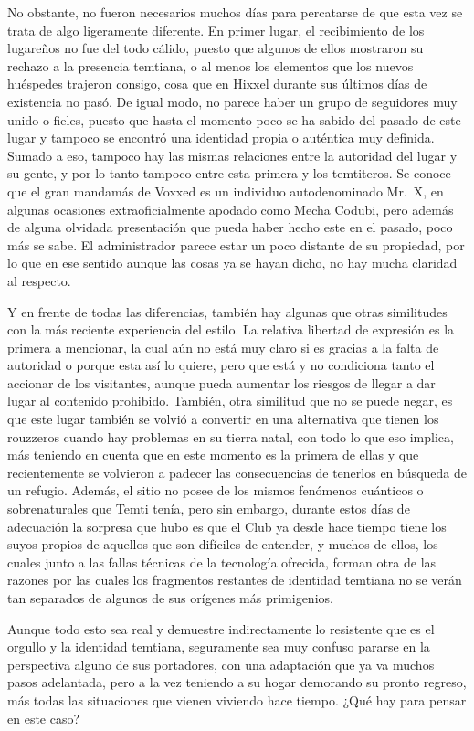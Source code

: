 \documentclass[
  spanish,
]{book}
\begin{document}
No obstante, no fueron necesarios muchos días para percatarse de que esta vez se trata de algo ligeramente diferente. En primer lugar, el recibimiento de los lugareños no fue del todo cálido, puesto que algunos de ellos mostraron su rechazo a la presencia temtiana, o al menos los elementos que los nuevos huéspedes trajeron consigo, cosa que en Hixxel durante sus últimos días de existencia no pasó. De igual modo, no parece haber un grupo de seguidores muy unido o fieles, puesto que hasta el momento poco se ha sabido del pasado de este lugar y tampoco se encontró una identidad propia o auténtica muy definida. Sumado a eso, tampoco hay las mismas relaciones entre la autoridad del lugar y su gente, y por lo tanto tampoco entre esta primera y los temtiteros. Se conoce que el gran mandamás de Voxxed es un individuo autodenominado Mr.~X, en algunas ocasiones extraoficialmente apodado como Mecha Codubi, pero además de alguna olvidada presentación que pueda haber hecho este en el pasado, poco más se sabe. El administrador parece estar un poco distante de su propiedad, por lo que en ese sentido aunque las cosas ya se hayan dicho, no hay mucha claridad al respecto.

Y en frente de todas las diferencias, también hay algunas que otras similitudes con la más reciente experiencia del estilo. La relativa libertad de expresión es la primera a mencionar, la cual aún no está muy claro si es gracias a la falta de autoridad o porque esta así lo quiere, pero que está y no condiciona tanto el accionar de los visitantes, aunque pueda aumentar los riesgos de llegar a dar lugar al contenido prohibido. También, otra similitud que no se puede negar, es que este lugar también se volvió a convertir en una alternativa que tienen los rouzzeros cuando hay problemas en su tierra natal, con todo lo que eso implica, más teniendo en cuenta que en este momento es la primera de ellas y que recientemente se volvieron a padecer las consecuencias de tenerlos en búsqueda de un refugio. Además, el sitio no posee de los mismos fenómenos cuánticos o sobrenaturales que Temti tenía, pero sin embargo, durante estos días de adecuación la sorpresa que hubo es que el Club ya desde hace tiempo tiene los suyos propios de aquellos que son difíciles de entender, y muchos de ellos, los cuales junto a las fallas técnicas de la tecnología ofrecida, forman otra de las razones por las cuales los fragmentos restantes de identidad temtiana no se verán tan separados de algunos de sus orígenes más primigenios.

Aunque todo esto sea real y demuestre indirectamente lo resistente que es el orgullo y la identidad temtiana, seguramente sea muy confuso pararse en la perspectiva alguno de sus portadores, con una adaptación que ya va muchos pasos adelantada, pero a la vez teniendo a su hogar demorando su pronto regreso, más todas las situaciones que vienen viviendo hace tiempo. ¿Qué hay para pensar en este caso?
\end{document}
